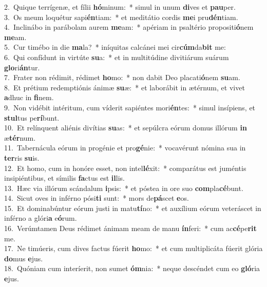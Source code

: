 {2.~}Quique terrígenæ, et fílii \textbf{hó}minum:~* simul in unum \textbf{di}ves et \textbf{pau}per.\\
{3.~}Os meum loquétur sapi\textbf{én}tiam:~* et meditátio cordis \textbf{me}i pru\textbf{dén}tiam.\\
{4.~}Inclinábo in parábolam aurem \textbf{me}am:~* apériam in psaltério propositi\textbf{ó}nem \textbf{me}am.\\
{5.~}Cur timébo in die \textbf{ma}la?~* iníquitas calcánei mei cir\textbf{cúm}da\textbf{bit} me:\\
{6.~}Qui confídunt in virtúte \textbf{su}a:~* et in multitúdine divitiárum suárum \textbf{glo}ri\textbf{án}tur.\\
{7.~}Frater non rédimit, rédimet \textbf{ho}mo:~* non dabit Deo placati\textbf{ó}nem \textbf{su}am.\\
{8.~}Et prétium redemptiónis ánimæ \textbf{su}æ:~* et laborábit in ætérnum, et vivet \textbf{a}dhuc in \textbf{fi}nem.\\
{9.~}Non vidébit intéritum, cum víderit sapiéntes mori\textbf{én}tes:~* simul insípiens, et \textbf{stul}tus pe\textbf{rí}bunt.\\
{10.~}Et relínquent aliénis divítias \textbf{su}as:~* et sepúlcra eórum domus illórum \textbf{in} æ\textbf{tér}num.\\
{11.~}Tabernácula eórum in progénie et pro\textbf{gé}nie:~* vocavérunt nómina sua in \textbf{ter}ris \textbf{su}is.\\
{12.~}Et homo, cum in honóre esset, non intel\textbf{lé}xit:~* comparátus est juméntis insipiéntibus, et símilis \textbf{fa}ctus est \textbf{il}lis.\\
{13.~}Hæc via illórum scándalum \textbf{i}psis:~* et póstea in ore suo \textbf{com}pla\textbf{cé}bunt.\\
{14.~}Sicut oves in inférno pósi\textbf{ti} sunt:~* mors de\textbf{pá}scet \textbf{e}os.\\
{15.~}Et dominabúntur eórum justi in matu\textbf{tí}no:~* et auxílium eórum veteráscet in inférno a glóri\textbf{a} e\textbf{ó}rum.\\
{16.~}Verúmtamen Deus rédimet ánimam meam de manu \textbf{ín}feri:~* cum ac\textbf{cé}pe\textbf{rit} me.\\
{17.~}Ne timúeris, cum dives factus fúerit \textbf{ho}mo:~* et cum multiplicáta fúerit glória \textbf{do}mus \textbf{e}jus.\\
{18.~}Quóniam cum interíerit, non sumet \textbf{óm}nia:~* neque descéndet cum eo \textbf{gló}ria \textbf{e}jus.\\
